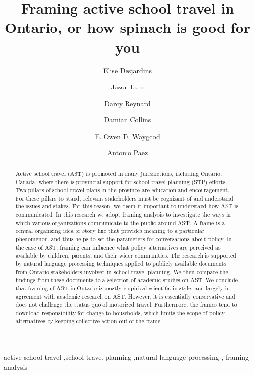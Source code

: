 \documentclass[preprint, 3p,
authoryear]{elsarticle} %
\begin{document}
\begin{frontmatter}

  \title{Framing active school travel in Ontario, or how spinach is good
for you}
    \author[McMaster University]{Elise Desjardins%
  }
    \author[McMaster University]{Jason Lam%
  }
    \author[University of Alberta]{Darcy Reynard%
  }
    \author[University of Alberta]{Damian Collins%
  }
    \author[Polytechnique Montreal]{E. Owen D. Waygood%
  }
    \author[McMaster University]{Antonio Paez%
  }
  
  \begin{abstract}
  Active school travel (AST) is promoted in many jurisdictions,
  including Ontario, Canada, where there is provincial support for
  school travel planning (STP) efforts. Two pillars of school travel
  plans in the province are education and encouragement. For these
  pillars to stand, relevant stakeholders must be cognizant of and
  understand the issues and stakes. For this reason, we deem it
  important to understand how AST is communicated. In this research we
  adopt framing analysis to investigate the ways in which various
  organizations communicate to the public around AST. A frame is a
  central organizing idea or story line that provides meaning to a
  particular phenomenon, and thus helps to set the parameters for
  conversations about policy. In the case of AST, framing can influence
  what policy alternatives are perceived as available by children,
  parents, and their wider communities. The research is supported by
  natural language processing techniques applied to publicly available
  documents from Ontario stakeholders involved in school travel
  planning. We then compare the findings from these documents to a
  selection of academic studies on AST. We conclude that framing of AST
  in Ontario is mostly empirical-scientific in style, and largely in
  agreement with academic research on AST. However, it is essentially
  conservative and does not challenge the status quo of motorized
  travel. Furthermore, the frames tend to download responsibility for
  change to households, which limits the scope of policy alternatives by
  keeping collective action out of the frame.
  \end{abstract}
    \begin{keyword}
    active school travel \sep school travel planning \sep natural
language processing \sep 
    framing analysis
  \end{keyword}
  

\end{frontmatter}
\end{document}
